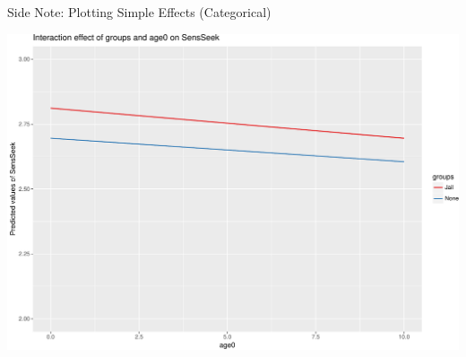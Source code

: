 \begin{frame}[fragile]{Side Note: Plotting Simple Effects (Categorical)}

\small

\begin{Shaded}
\begin{Highlighting}[]
 \NormalTok{, }
\end{Highlighting}
\end{Shaded}

\includegraphics{Conditional_Models_files/figure-beamer/unnamed-chunk-27-1.pdf}

\end{frame}

